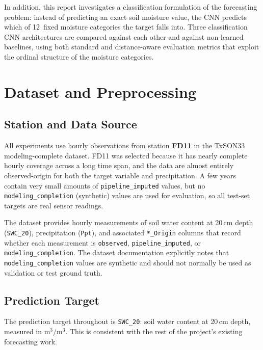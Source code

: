 \documentclass[11pt]{article}
\begin{document}
In addition, this report investigates a classification formulation of the
forecasting problem: instead of predicting an exact soil moisture value, the CNN
predicts which of 12~fixed moisture categories the target falls into. Three
classification CNN architectures are compared against each other and against
non-learned baselines, using both standard and distance-aware evaluation metrics
that exploit the ordinal structure of the moisture categories.

\section{Dataset and Preprocessing}

\subsection{Station and Data Source}

All experiments use hourly observations from station \textbf{FD11} in the TxSON33
modeling-complete dataset. FD11 was selected because it has nearly complete hourly
coverage across a long time span, and the data are almost entirely observed-origin
for both the target variable and precipitation. A few years contain very small
amounts of \texttt{pipeline\_imputed} values, but no
\texttt{modeling\_completion} (synthetic) values are used for evaluation, so all
test-set targets are real sensor readings.

The dataset provides hourly measurements of soil water content at 20\,cm depth
(\texttt{SWC\_20}), precipitation (\texttt{Ppt}), and associated
\texttt{*\_Origin} columns that record whether each measurement is
\texttt{observed}, \texttt{pipeline\_imputed}, or \texttt{modeling\_completion}.
The dataset documentation explicitly notes that \texttt{modeling\_completion} values
are synthetic and should not normally be used as validation or test ground truth.

\subsection{Prediction Target}

The prediction target throughout is \texttt{SWC\_20}: soil water content at 20\,cm
depth, measured in $\text{m}^3/\text{m}^3$. This is consistent with the rest of the
project's existing forecasting work.
\end{document}
